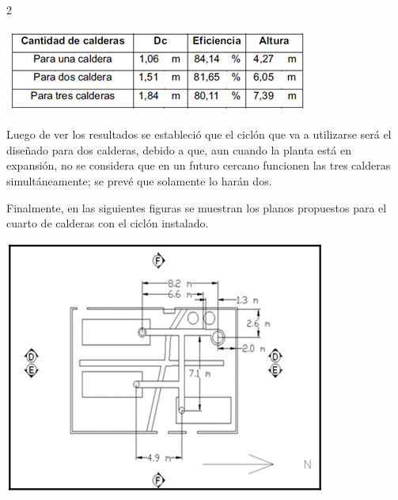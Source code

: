 \documentclass[12pt,spanish,Letterpaper,openany]{book}
\newcommand{\spacetenmilis}{\vspace{10mm}}
\newcommand{\spacefivemilis}{\vspace{5mm}}
\begin{document}
\begin {multicols}{2}
\begin {flushleft}
\noindent\begin{minipage}[c]{\columnwidth}

\spacetenmilis

\centering

\includegraphics[width=1\linewidth]{images/image13_wvaliente}

\end{minipage}

\end {flushleft}

\spacetenmilis

Luego de ver los resultados se estableció que el ciclón que va a utilizarse será el diseñado para dos calderas, debido a que, aun cuando la planta está en expansión, no se considera que en un futuro cercano funcionen las tres calderas simultáneamente; se prevé que solamente lo harán dos.

\spacefivemilis

Finalmente, en las siguientes figuras se muestran los planos propuestos para el cuarto de calderas con el ciclón instalado.

\begin {flushleft}
\noindent\begin{minipage}[c]{\columnwidth}

\centering

\includegraphics[width=1\linewidth]{images/image14_wvaliente}


\end{minipage}
\end{flushleft}
\end{multicols}
\end{document}
